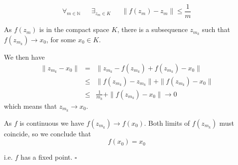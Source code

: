 \documentclass[12pt]{article}
\begin{document}
\begin{displaymath}
\forall_{m \in \mathbb{N}} \quad\;\; \exists_{z_m \in K} \quad\;\; \|f(z_m)-z_m\| \leq \frac{1}{m}
\end{displaymath}

As $f(z_m)$ is in the compact space $K$, there is a subsequence $z_{m_k}$ such that $f(z_{m_k}) \longrightarrow x_0$, for some $x_0 \in K$.

We then have
\begin{eqnarray*}
\|z_{m_k} -x_0\| & = & \|z_{m_k} - f(z_{m_k}) +f(z_{m_k}) -x_0\| \\
& \leq & \|f(z_{m_k})-z_{m_k}\| + \|f(z_{m_k}) - x_0\| \\
& \leq & \frac{1}{m_k} + \|f(z_{m_k}) - x_0\| \longrightarrow 0
\end{eqnarray*}
which means that $z_{m_k} \longrightarrow x_0$.

As $f$ is continuous we have $f(z_{m_k}) \longrightarrow f(x_0)$. Both limits of $f(z_{m_k})$ must coincide, so we conclude that
\begin{displaymath}
f(x_0)=x_0
\end{displaymath}

i.e. $f$ has a fixed point. $\square$
\end{document}
